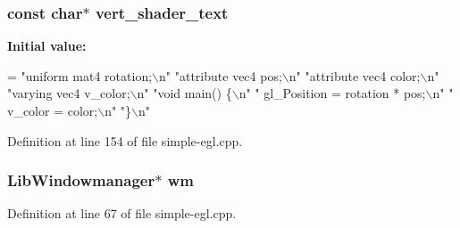 \subsubsection[{\texorpdfstring{vert\+\_\+shader\+\_\+text}{vert_shader_text}}]{\setlength{\rightskip}{0pt plus 5cm}const char$\ast$ vert\+\_\+shader\+\_\+text\hspace{0.3cm}{\ttfamily [static]}}\hypertarget{simple-egl_8cpp_a717575939a37d84dcd4cf0447a630834}{}\label{simple-egl_8cpp_a717575939a37d84dcd4cf0447a630834}
{\bfseries Initial value\+:}
\begin{DoxyCode}
=
    \textcolor{stringliteral}{"uniform mat4 rotation;\(\backslash\)n"}
    \textcolor{stringliteral}{"attribute vec4 pos;\(\backslash\)n"}
    \textcolor{stringliteral}{"attribute vec4 color;\(\backslash\)n"}
    \textcolor{stringliteral}{"varying vec4 v\_color;\(\backslash\)n"}
    \textcolor{stringliteral}{"void main() \{\(\backslash\)n"}
    \textcolor{stringliteral}{"  gl\_Position = rotation * pos;\(\backslash\)n"}
    \textcolor{stringliteral}{"  v\_color = color;\(\backslash\)n"}
    \textcolor{stringliteral}{"\}\(\backslash\)n"}
\end{DoxyCode}


Definition at line 154 of file simple-\/egl.\+cpp.

\subsubsection[{\texorpdfstring{wm}{wm}}]{\setlength{\rightskip}{0pt plus 5cm}Lib\+Windowmanager$\ast$ wm}\hypertarget{simple-egl_8cpp_ad1513698e07197206c290f94d7669d85}{}\label{simple-egl_8cpp_ad1513698e07197206c290f94d7669d85}


Definition at line 67 of file simple-\/egl.\+cpp.

